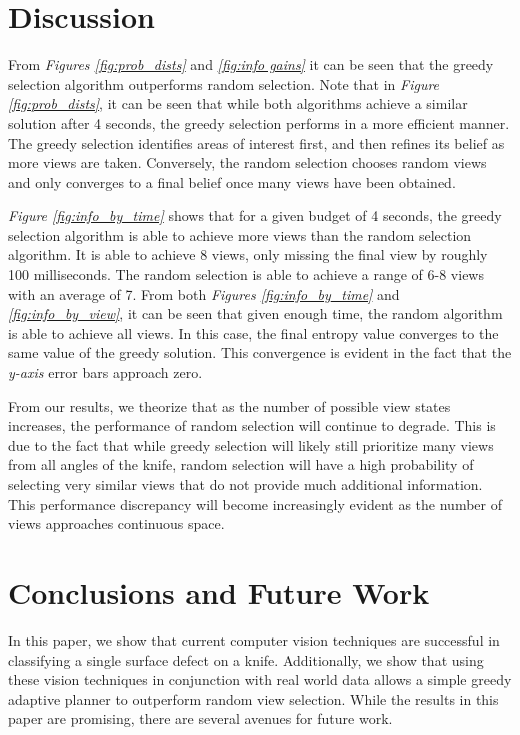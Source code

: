 \documentclass[letterpaper, 10 pt, conference]{ieeeconf}  %
\begin{document}
\section{Discussion}

From \textit{Figures \ref{fig:prob_dists}} and \textit{\ref{fig:info gains}} it can be seen that the greedy selection algorithm outperforms random selection. Note that in \textit{Figure \ref{fig:prob_dists}}, it can be seen that while both algorithms achieve a similar solution after 4 seconds, the greedy selection performs in a more efficient manner. The greedy selection identifies areas of interest first, and then refines its belief as more views are taken. Conversely, the random selection chooses random views and only converges to a final belief once many views have been obtained.

\textit{Figure \ref{fig:info_by_time}} shows that for a given budget of 4 seconds, the greedy selection algorithm is able to achieve more views than the random selection algorithm. It is able to achieve 8 views, only missing the final view by roughly 100 milliseconds. The random selection is able to achieve a range of 6-8 views with an average of 7. From both \textit{Figures \ref{fig:info_by_time}} and \textit{\ref{fig:info_by_view}}, it can be seen that given enough time, the random algorithm is able to achieve all views. In this case, the final entropy value converges to the same value of the greedy solution. This convergence is evident in the fact that the \textit{y-axis} error bars approach zero.

From our results, we theorize that as the number of possible view states increases, the performance of random selection will continue to degrade. This is due to the fact that while greedy selection will likely still prioritize many views from all angles of the knife, random selection will have a high probability of selecting very similar views that do not provide much additional information. This performance discrepancy will become increasingly evident as the number of views approaches continuous space.

\section{Conclusions and Future Work}

In this paper, we show that current computer vision techniques are successful in classifying a single surface defect on a knife. Additionally, we show that using these vision techniques in conjunction with real world data allows a simple greedy adaptive planner to outperform random view selection. While the results in this paper are promising, there are several avenues for future work.
\end{document}
